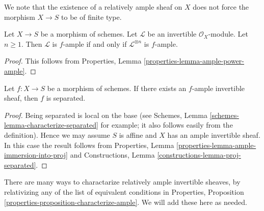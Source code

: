 \noindent
We note that the existence of a relatively ample sheaf on $X$ does not
force the morphism $X \to S$ to be of finite type.

\begin{lemma}
\label{lemma-ample-power-ample}
Let $X \to S$ be a morphism of schemes.
Let $\mathcal{L}$ be an invertible $\mathcal{O}_X$-module.
Let $n \geq 1$. Then $\mathcal{L}$ is $f$-ample if and only if
$\mathcal{L}^{\otimes n}$ is $f$-ample.
\end{lemma}

\begin{proof}
This follows from Properties, Lemma \ref{properties-lemma-ample-power-ample}.
\end{proof}

\begin{lemma}
\label{lemma-relatively-ample-separated}
Let $f : X \to S$ be a morphism of schemes.
If there exists an $f$-ample invertible sheaf, then
$f$ is separated.
\end{lemma}

\begin{proof}
Being separated is local on the base (see
Schemes, Lemma \ref{schemes-lemma-characterize-separated} for example;
it also follows easily from the definition).
Hence we may assume $S$ is affine and $X$
has an ample invertible sheaf. In this case the
result follows from
Properties, Lemma \ref{properties-lemma-ample-immersion-into-proj}
and Constructions, Lemma \ref{constructions-lemma-proj-separated}.
\end{proof}

\noindent
There are many ways to charactarize relatively ample invertible
sheaves, by relativizing any of the list of equivalent conditions in
Properties, Proposition \ref{properties-proposition-characterize-ample}.
We will add these here as needed.

